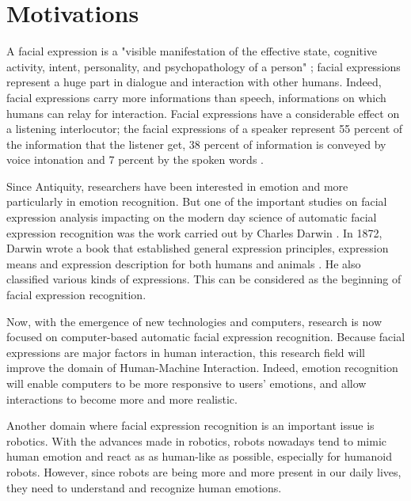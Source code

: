 \chapter{Motivations}

\noindent A facial expression is a "visible manifestation of the effective state, cognitive activity, intent, personality, and psychopathology of a person" \cite{DON99}; facial expressions represent a huge part in dialogue and interaction with other humans. Indeed, facial expressions carry more informations than speech, informations on which humans can relay for interaction. Facial expressions have a considerable effect on a listening interlocutor; the facial expressions of a speaker represent 55 percent of the information that the listener get, 38 percent of information is conveyed by voice intonation and 7 percent by the spoken words \cite{PAN00}.
\newline

\noindent Since Antiquity, researchers have been interested in emotion and more particularly in emotion recognition. But one of the important studies on facial expression analysis impacting on the modern day science of automatic facial expression recognition was the work carried out by Charles Darwin \cite{BET12}. In 1872, Darwin wrote a book that established general expression principles, expression means and expression description for both humans and animals \cite{DAR04}. He also classified various kinds of expressions. This can be considered as the beginning of facial expression recognition.
\newline

\noindent Now, with the emergence of new technologies and computers, research is now focused on computer-based automatic facial expression recognition. Because facial expressions are major factors in human interaction, this research field will improve the domain of Human-Machine Interaction. Indeed, emotion recognition will enable computers to be more responsive to users' emotions, and allow interactions to become more and more realistic. 
\newline

\noindent Another domain where facial expression recognition is an important issue is robotics. With the advances made in robotics, robots nowadays tend to mimic human emotion and react as as human-like as possible, especially for humanoid robots. However, since robots are being more and more present in our daily lives, they need to understand and recognize human emotions.
\newline

